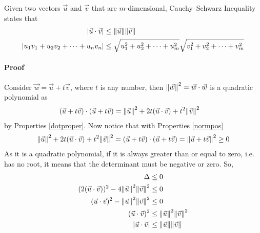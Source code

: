 \begin{thm}
\label{CauchySch}
Given two vectors $\vec{u}$ and $\vec{v}$ that are $m$-dimensional, Cauchy–Schwarz Inequality states that
\begin{align*}
|\vec{u} \cdot \vec{v}| &\leq \norm{\vec{u}}\norm{\vec{v}} \\
|u_1v_1+u_2v_2+\cdots+u_nv_n| &\leq \sqrt{u_1^2+u_2^2+\cdots+u_m^2}\sqrt{v_1^2+v_2^2+\cdots+v_m^2}
\end{align*}
\paragraph{Proof} Consider $\vec{w} = \vec{u} + t\vec{v}$, where $t$ is any number, then $\norm{\vec{w}}^2 = \vec{w}\cdot\vec{w}$ is a quadratic polynomial as
\begin{align*}
(\vec{u} + t\vec{v}) \cdot (\vec{u} + t\vec{v}) &= \norm{\vec{u}}^2 + 2t(\vec{u} \cdot \vec{v}) + t^2\norm{\vec{v}}^2
\end{align*}
by Properties \ref{dotproper}.
Now notice that with Properties \ref{normpos}
\begin{align*}
\norm{\vec{u}}^2 + 2t(\vec{u} \cdot \vec{v}) + t^2\norm{\vec{v}}^2 =(\vec{u} + t\vec{v}) \cdot (\vec{u} + t\vec{v}) = \norm{\vec{u} + t\vec{v}}^2 \geq 0    
\end{align*}
As it is a quadratic polynomial, if it is always greater than or equal to zero, i.e. has no root, it means that the determinant must be negative or zero. So,
\begin{align*}
\Delta &\leq 0 \\
(2(\vec{u} \cdot \vec{v}))^2 - 4\norm{\vec{u}}^2\norm{\vec{v}}^2 &\leq 0 \\
(\vec{u} \cdot \vec{v})^2 - \norm{\vec{u}}^2\norm{\vec{v}}^2 &\leq 0 \\
(\vec{u} \cdot \vec{v})^2 &\leq \norm{\vec{u}}^2\norm{\vec{v}}^2 \\
|\vec{u} \cdot \vec{v}| &\leq \norm{\vec{u}}\norm{\vec{v}}
\end{align*}
\end{thm}

